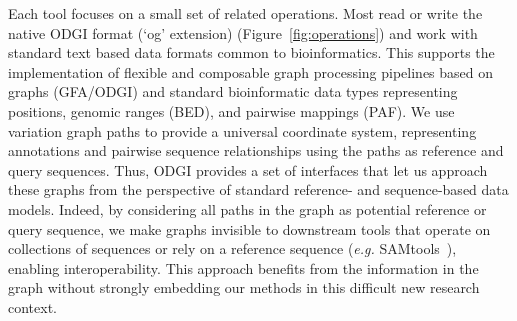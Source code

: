 \documentclass{bioinfo}
\begin{document}
Each tool focuses on a small set of related operations.
Most read or write the native ODGI format (`og' extension) (Figure~\ref{fig:operations}) and work with standard text based data formats common to bioinformatics.
This supports the implementation of flexible and composable graph processing pipelines based on graphs (GFA/ODGI) and standard bioinformatic data types representing positions, genomic ranges (BED), and pairwise mappings (PAF).
We use variation graph paths to provide a universal coordinate system, representing annotations and pairwise sequence relationships using the paths as reference and query sequences.
Thus, ODGI provides a set of interfaces that let us approach these graphs from the perspective of standard reference- and sequence-based data models.
Indeed, by considering all paths in the graph as potential reference or query sequence, we make graphs invisible to downstream tools that operate on collections of sequences or rely on a reference sequence (\textit{e.g.} SAMtools~\citep{Li2009}), enabling interoperability.
This approach benefits from the information in the graph without strongly embedding our methods in this difficult new research context.


\end{document}
